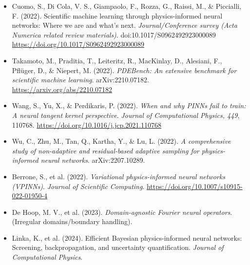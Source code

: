 \begin{itemize}
    \item Cuomo, S., Di Cola, V. S., Giampaolo, F., Rozza, G., Raissi, M., \& Piccialli, F. (2022). Scientific machine learning through physics-informed neural networks: Where we are and what’s next. \textit{Journal/Conference survey (Acta Numerica related review materials)}. doi:10.1017/S0962492923000089 \url{https://doi.org/10.1017/S0962492923000089}
    \item Takamoto, M., Praditia, T., Leiteritz, R., MacKinlay, D., Alesiani, F., Pflüger, D., \& Niepert, M. (2022). \textit{PDEBench: An extensive benchmark for scientific machine learning}. arXiv:2210.07182. \url{https://arxiv.org/abs/2210.07182}
    \item Wang, S., Yu, X., \& Perdikaris, P. (2022). \textit{When and why PINNs fail to train: A neural tangent kernel perspective}. \textit{Journal of Computational Physics, 449}, 110768. \url{https://doi.org/10.1016/j.jcp.2021.110768}
    \item Wu, C., Zhu, M., Tan, Q., Kartha, Y., \& Lu, L. (2022). \textit{A comprehensive study of non-adaptive and residual-based adaptive sampling for physics-informed neural networks}. arXiv:2207.10289.
    \item Berrone, S., et al. (2022). \textit{Variational physics-informed neural networks (VPINNs)}. \textit{Journal of Scientific Computing}. \url{https://doi.org/10.1007/s10915-022-01950-4}
    \item De Hoop, M. V., et al. (2023). \textit{Domain-agnostic Fourier neural operators}. (Irregular domains/boundary handling).
    \item Linka, K., et al. (2024). Efficient Bayesian physics-informed neural networks: Screening, backpropagation, and uncertainty quantification. \textit{Journal of Computational Physics}.
\end{itemize}
